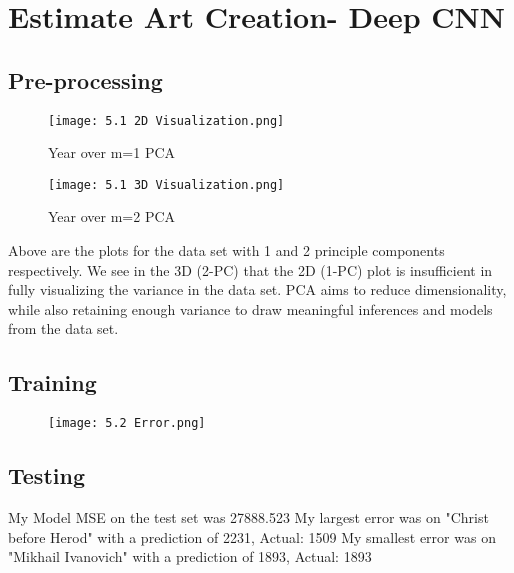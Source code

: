 \documentclass{article}
\begin{document}
\newpage
\section{Estimate Art Creation- Deep CNN}
\subsection{Pre-processing}
\begin{figure}[H]
    \centering
    \texttt{[image: 5.1 2D Visualization.png]}
    \caption{Year over m=1 PCA}
\end{figure}
\begin{figure}[H]
    \centering
    \texttt{[image: 5.1 3D Visualization.png]}
    \caption{Year over m=2 PCA}
\end{figure}

Above are the plots for the data set with 1 and 2 principle components respectively. We see in the 3D (2-PC) that the 2D (1-PC) plot is insufficient in fully visualizing the variance in the data set. PCA aims to reduce dimensionality, while also retaining enough variance to draw meaningful inferences and models from the data set.

\subsection{Training}
\begin{figure}[H]
    \centering
    \texttt{[image: 5.2 Error.png]}
\end{figure}


\subsection{Testing}

My Model MSE on the test set was 27888.523
My largest error was on "Christ before Herod" with a prediction of 2231, Actual: 1509 
My smallest error was on "Mikhail Ivanovich" with a prediction of 1893, Actual: 1893 
\end{document}
